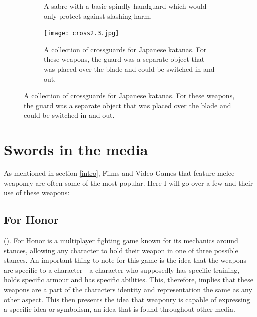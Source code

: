 \documentclass{article}
\begin{document}
\begin{figure}[H]
\begin{subfigure}{0.3\textwidth}
        \caption{A sabre with a basic spindly handguard which would only protect against slashing harm.}
        \label{fig:Cross2.4}
    \end{subfigure}
        \begin{subfigure}{0.75\textwidth}
        \centering
        \texttt{[image: cross2.3.jpg]}
        \caption{A collection of crossguards for Japanese katanas. For these weapons, the guard was a separate object that was placed over the blade and could be switched in and out.}
        \label{fig:Cross2.3}
    \end{subfigure}
\end{figure}

\pagebreak

\section{Swords in the media} \label{media}
As mentioned in section \ref{intro}, Films and Video Games that feature melee weaponry are often some of the most popular. Here I will go over a few and their use of these weapons:

\subsection{For Honor}
().
For Honor is a multiplayer fighting game known for its mechanics around stances, allowing any character to hold their weapon in one of three possible stances. An important thing to note for this game is the idea that the weapons are specific to a character - a character who supposedly has specific training, holds specific armour and has specific abilities. This, therefore, implies that these weapons are a part of the characters identity and representation the same as any other aspect. This then presents the idea that weaponry is capable of expressing a specific idea or symbolism, an idea that is found throughout other media.
\end{document}
